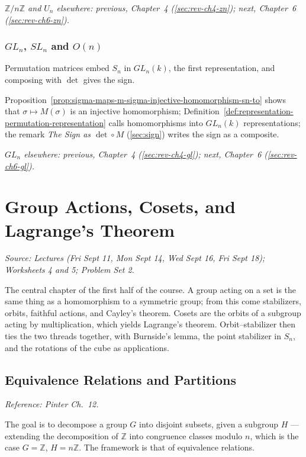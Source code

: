 \documentclass[11pt]{report}
\begin{document}
\textit{$\mathbb{Z}/n\mathbb{Z}$ and $U_n$ elsewhere: previous, Chapter~4 (\ref{sec:rev-ch4-zn}); next, Chapter~6 (\ref{sec:rev-ch6-zn}).}

\subsection{\texorpdfstring{$GL_n$, $SL_n$ and $O(n)$}{GLₙ, SLₙ and O(n)}}\label{sec:rev-ch5-gl}

Permutation matrices embed $S_n$ in $GL_n(k)$, the first representation, and composing with $\det$ gives the sign.

Proposition~\ref{prop:sigma-maps-m-sigma-injective-homomorphism-sn-to} shows that $\sigma \mapsto M(\sigma)$ is an injective homomorphism; Definition~\ref{def:representation-permutation-representation} calls homomorphisms into $GL_n(k)$ representations; the remark \emph{The Sign as $\det \circ M$} (\ref{sec:sign}) writes the sign as a composite.

\textit{$GL_n$ elsewhere: previous, Chapter~4 (\ref{sec:rev-ch4-gl}); next, Chapter~6 (\ref{sec:rev-ch6-gl}).}

\chapter{Group Actions, Cosets, and Lagrange's Theorem}\label{ch:actions}

\textit{Source: Lectures (Fri Sept 11, Mon Sept 14, Wed Sept 16, Fri Sept 18); Worksheets 4 and 5; Problem Set 2.}

The central chapter of the first half of the course. A group acting on a set is the same thing as a homomorphism to a symmetric group; from this come stabilizers, orbits, faithful actions, and Cayley's theorem. Cosets are the orbits of a subgroup acting by multiplication, which yields Lagrange's theorem. Orbit--stabilizer then ties the two threads together, with Burnside's lemma, the point stabilizer in $S_n$, and the rotations of the cube as applications.

\section{Equivalence Relations and Partitions}\label{sec:equivalence}

\textit{Reference: Pinter Ch.\ 12.}

The goal is to decompose a group $G$ into disjoint subsets, given a subgroup $H$ --- extending the decomposition of $\mathbb{Z}$ into congruence classes modulo $n$, which is the case $G = \mathbb{Z}$, $H = n\mathbb{Z}$. The framework is that of equivalence relations.
\end{document}
